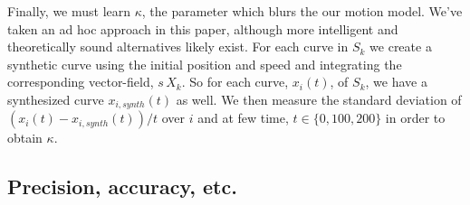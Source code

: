 \documentclass[conference]{IEEEtran}
\begin{document}
  Finally, we must learn $\kappa$, the parameter which blurs the our motion model.
  We've taken an ad hoc approach in this paper, although more intelligent and theoretically sound alternatives likely exist.
  For each curve in $S_k$ we create a synthetic curve using the initial position and speed and integrating the corresponding vector-field, $s\, X_k$.
  So for each curve, $x_i(t)$, of $S_k$, we have a synthesized curve $x_{i,synth}(t)$ as well.
  We then measure the standard deviation of $(x_i(t) - x_{i,synth}(t)) / t$ over $i$ and at few time, $t \in \{ 0, 100, 200 \}$ in order to obtain $\kappa$.
  
 \subsection{ Precision, accuracy, etc.}
\end{document}
